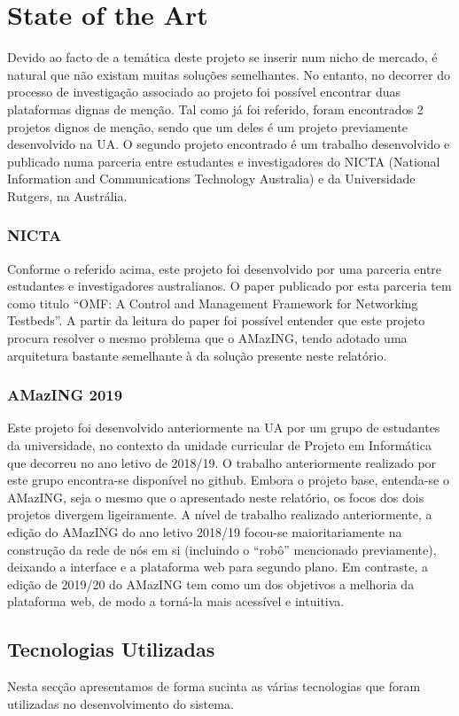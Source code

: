 \chapter{State of the Art}
Devido ao facto de a temática deste projeto se inserir num nicho de mercado, é natural que não existam muitas soluções semelhantes. No entanto, no decorrer do processo de investigação associado ao projeto foi possível encontrar duas plataformas dignas de menção.
Tal como já foi referido, foram encontrados 2 projetos dignos de menção, sendo que um deles é um projeto previamente desenvolvido na UA. O segundo projeto encontrado é um trabalho desenvolvido e publicado numa parceria entre estudantes e investigadores do NICTA (National Information and Communications Technology Australia) e da Universidade Rutgers, na Austrália.
\subsection{NICTA}
Conforme o referido acima, este projeto foi desenvolvido por uma parceria entre estudantes e investigadores australianos. O paper publicado por esta parceria tem como titulo “OMF: A Control and Management Framework for Networking Testbeds”. A partir da leitura do paper foi possível entender que este projeto procura resolver o mesmo problema que o AMazING, tendo adotado uma arquitetura bastante semelhante à da solução presente neste relatório.
\subsection{AMazING 2019}
Este projeto foi desenvolvido anteriormente na UA por um grupo de estudantes da universidade, no contexto da unidade curricular de Projeto em Informática que decorreu no ano letivo de 2018/19. O trabalho anteriormente realizado por este grupo encontra-se disponível no github. Embora o projeto base, entenda-se o AMazING, seja o mesmo que o apresentado neste relatório, os focos dos dois projetos divergem ligeiramente.\newline
A nível de trabalho realizado anteriormente, a edição do AMazING do ano letivo 2018/19 focou-se maioritariamente na construção da rede de nós em si (incluindo o “robô” mencionado previamente), deixando a interface e a plataforma web para segundo plano. Em contraste, a edição de 2019/20 do AMazING tem como um dos objetivos a melhoria da plataforma web, de modo a torná-la mais acessível e intuitiva.

\section{Tecnologias Utilizadas}
Nesta secção apresentamos de forma sucinta as várias tecnologias que foram utilizadas no desenvolvimento do sistema.

